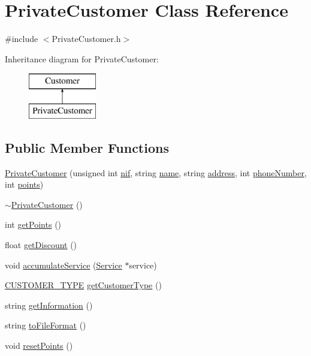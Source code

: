 \hypertarget{classPrivateCustomer}{}\section{Private\+Customer Class Reference}
\label{classPrivateCustomer}


{\ttfamily \#include $<$Private\+Customer.\+h$>$}

Inheritance diagram for Private\+Customer\+:\begin{figure}[H]
\begin{center}
\leavevmode
\includegraphics[height=2.000000cm]{classPrivateCustomer}
\end{center}
\end{figure}
\subsection*{Public Member Functions}
\begin{DoxyCompactItemize}
\item 
\hyperlink{classPrivateCustomer_ab9d59484ad8056c18e470d247d6c5fa6}{Private\+Customer} (unsigned int \hyperlink{classCustomer_a65ad3329532d5ad31e36f4ac81858e31}{nif}, string \hyperlink{classCustomer_a42c1c948fa0121c82b2725826d9f8300}{name}, string \hyperlink{classCustomer_a72d87951c1b76883390d00baf044cf2c}{address}, int \hyperlink{classCustomer_ad8c8d99b4c35f66a1a87b234c6078e0f}{phone\+Number}, int \hyperlink{classPrivateCustomer_a1dd69e30a5c32c3cab647f96eaa89325}{points})
\item 
\hyperlink{classPrivateCustomer_a916690ac1f0e8e28e9aeff4bb207169e}{$\sim$\+Private\+Customer} ()
\item 
int \hyperlink{classPrivateCustomer_ad8c8c1ff1cf54e6e60d73b7c6806e699}{get\+Points} ()
\item 
float \hyperlink{classPrivateCustomer_a4757f4e3cb5e0e74891e8f1b37a07277}{get\+Discount} ()
\item 
void \hyperlink{classPrivateCustomer_a22e7d589398c26ac37973660f6e6f338}{accumulate\+Service} (\hyperlink{classService}{Service} $\ast$service)
\item 
\hyperlink{classCustomer_adf157cb713398bb38163743659ec3049}{C\+U\+S\+T\+O\+M\+E\+R\+\_\+\+T\+Y\+PE} \hyperlink{classPrivateCustomer_a07d4d3e5995758b2407b8a81e35e579a}{get\+Customer\+Type} ()
\item 
string \hyperlink{classPrivateCustomer_afcf22c4a25e9c961d045aa5a0d8d9fd2}{get\+Information} ()
\item 
string \hyperlink{classPrivateCustomer_adb678cbc09d9e4a8e9e4ab0d556b8b6c}{to\+File\+Format} ()
\item 
void \hyperlink{classPrivateCustomer_a2e633d2d89e3ce4696e810ddb8c64bd0}{reset\+Points} ()
\end{DoxyCompactItemize}
